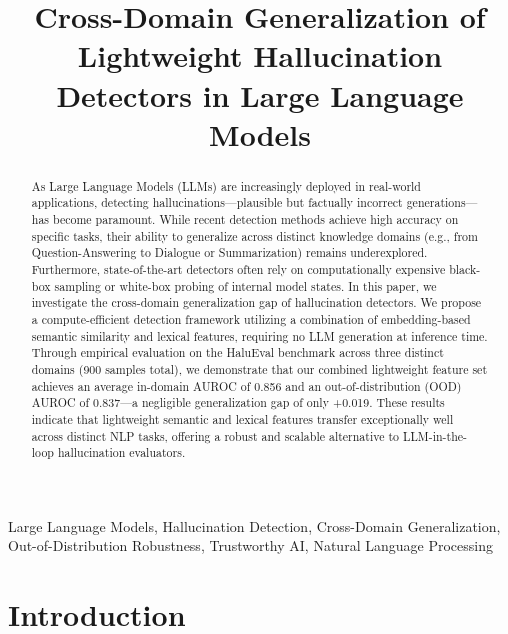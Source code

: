 \documentclass[conference]{IEEEtran}
\begin{document}
\title{Cross-Domain Generalization of Lightweight Hallucination\\
Detectors in Large Language Models}

\author{
}

\maketitle

\begin{abstract}
As Large Language Models (LLMs) are increasingly deployed in real-world applications, detecting hallucinations—plausible but factually incorrect generations—has become paramount. While recent detection methods achieve high accuracy on specific tasks, their ability to generalize across distinct knowledge domains (e.g., from Question-Answering to Dialogue or Summarization) remains underexplored. Furthermore, state-of-the-art detectors often rely on computationally expensive black-box sampling or white-box probing of internal model states. In this paper, we investigate the cross-domain generalization gap of hallucination detectors. We propose a compute-efficient detection framework utilizing a combination of embedding-based semantic similarity and lexical features, requiring no LLM generation at inference time. Through empirical evaluation on the HaluEval benchmark across three distinct domains (900 samples total), we demonstrate that our combined lightweight feature set achieves an average in-domain AUROC of 0.856 and an out-of-distribution (OOD) AUROC of 0.837—a negligible generalization gap of only +0.019. These results indicate that lightweight semantic and lexical features transfer exceptionally well across distinct NLP tasks, offering a robust and scalable alternative to LLM-in-the-loop hallucination evaluators.
\end{abstract}

\begin{IEEEkeywords}
Large Language Models, Hallucination Detection, Cross-Domain Generalization, Out-of-Distribution Robustness, Trustworthy AI, Natural Language Processing
\end{IEEEkeywords}

\section{Introduction}
\end{document}
